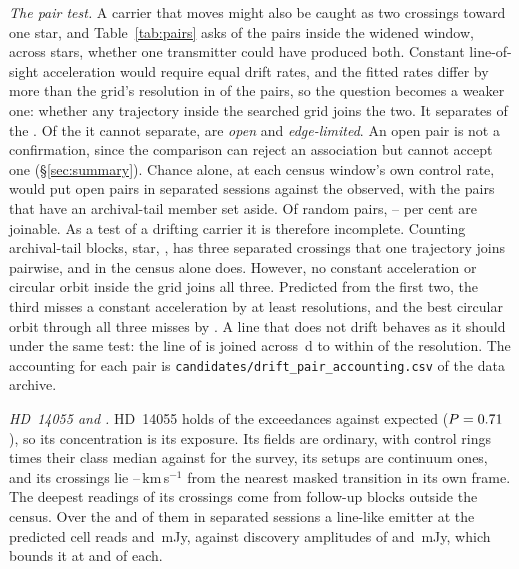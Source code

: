 \emph{The pair test.} A carrier that moves might also be caught as two
crossings toward one star, and Table~\ref{tab:pairs} asks of the \TjNPair{}
pairs inside the widened window, across \TjNStarPair{} stars, whether one
transmitter could have produced both. Constant line-of-sight acceleration
would require equal drift rates, and the fitted rates differ by more than the
grid's resolution in \TjNUneqDrift{} of the \TjNPair{} pairs, so the question
becomes a weaker one: whether any trajectory inside the searched grid joins
the two. It separates \TjNExcl{} of the \TjNPair. Of the \TjNOpen{} it
cannot separate, \TjNOpenPlain{} are \emph{open} and \TjNPairEdge{}
\emph{edge-limited}. An open pair is not a confirmation, since the
comparison can reject an association but cannot accept one
(\S\ref{sec:summary}). Chance alone, at each census window's own control
rate, would put \OpExpSepRange{} open pairs in separated sessions against the
\OpObsSep{} observed, with the pairs that have an archival-tail member set
aside. Of random pairs, \OpJoinPctLo--\OpJoinPctHi{} per cent are
joinable. As a test of a drifting carrier it is therefore incomplete.
Counting archival-tail blocks, \OpNTriAllWord{} star, \OpTriStars, has three
separated crossings that one trajectory joins pairwise, and in the census
alone \OpNTriCenWord{} does. However, no constant acceleration or circular
orbit inside the grid joins all three. Predicted from the first two, the
third misses a constant acceleration by at least
\TrAMissMin{} resolutions, and the best circular orbit through all three
misses by \TrJointMissMin. A line that does not drift behaves as it should
under the same test: the \TjCtlLine{} line of \TjCtlStar{} is joined across
\TjCtlDtD\,d to within \TjCtlNSig{} of the resolution. The accounting for
each pair is
\texttt{candidates/\allowbreak drift\_pair\_accounting.csv} of the data
archive.

\label{sec:twostars}%
\emph{HD~14055 and \BkAlmaName.} HD~14055 holds \TwNExcHD{} of the
exceedances against \TwExpCtrlHD{} expected ($P=0.71$), so its
concentration is its exposure. Its fields are ordinary, with control rings
\TwRingQHD{} times their class median against \TwRingQSurv{} for the survey,
its setups are continuum ones, and its crossings lie
\TwHDMaskLo--\TwHDMaskHi\,km\,s$^{-1}$ from the nearest masked transition in
its own frame. The deepest readings of its crossings come from follow-up
blocks outside the census. Over the \TwHDNDeepSepFirst{} and
\TwHDNDeepSepSecond{} of them in separated sessions a line-like emitter at
the predicted cell reads \TwHDRepFirst{} and \TwHDRepSecond\,mJy, against
discovery amplitudes of \TwHDDiscFirst{} and \TwHDDiscSecond\,mJy, which
bounds it at \TwHDFracFirst{} and \TwHDFracSecond{} of each.

